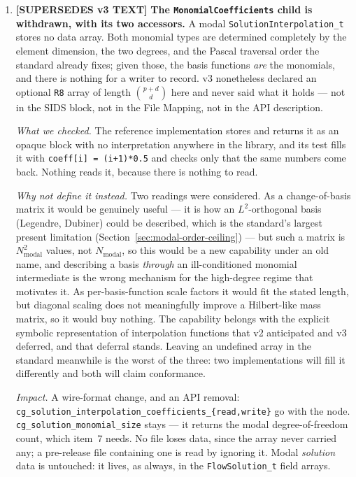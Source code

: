 \documentclass[11pt,letterpaper]{article}
\newif\ifvfourdraft
\newenvironment{v4block}{\ifvfourdraft\color{v4violet}\fi\ignorespaces}{\par}
\newcommand{\SUPERSEDESIV}{\ifvfourdraft
  \textcolor{v4violet}{\textbf{[SUPERSEDES v3 TEXT]}}\else
  \textcolor{clarifybrown}{\textbf{[SUPERSEDES v3 TEXT]}}\fi}
\begin{document}
{\begin{v4block}
\begin{enumerate}[leftmargin=1.4em,itemsep=0.5em]
  \item \SUPERSEDESIV{} \textbf{The \texttt{MonomialCoefficients} child is
    withdrawn, with its two accessors.}  A modal
    \texttt{SolutionInterpolation\_t} stores no data array.  Both monomial types
    are determined completely by the element dimension, the two degrees, and the
    Pascal traversal order the standard already fixes; given those, the basis
    functions \emph{are} the monomials, and there is nothing for a writer to
    record.  v3 nonetheless declared an optional \texttt{R8} array of length
    $\binom{p+d}{d}$ here and never said what it holds --- not in the SIDS block,
    not in the File Mapping, not in the API description.

    \textit{What we checked.}  The reference implementation stores and returns it
    as an opaque block with no interpretation anywhere in the library, and its
    test fills it with \texttt{coeff[i] = (i+1)*0.5} and checks only that the same
    numbers come back.  Nothing reads it, because there is nothing to read.

    \textit{Why not define it instead.}  Two readings were considered.  As a
    change-of-basis matrix it would be genuinely useful --- it is how an
    $L^2$-orthogonal basis (Legendre, Dubiner) could be described, which is the
    standard's largest present limitation (Section~\ref{sec:modal-order-ceiling})
    --- but such a matrix is $N_\mathrm{modal}^2$ values, not $N_\mathrm{modal}$,
    so this would be a new capability under an old name, and describing a basis
    \emph{through} an ill-conditioned monomial intermediate is the wrong
    mechanism for the high-degree regime that motivates it.  As per-basis-function
    scale factors it would fit the stated length, but diagonal scaling does not
    meaningfully improve a Hilbert-like mass matrix, so it would buy nothing.  The
    capability belongs with the explicit symbolic representation of interpolation
    functions that v2 anticipated and v3 deferred, and that deferral stands.
    Leaving an undefined array in the standard meanwhile is the worst of the
    three: two implementations will fill it differently and both will claim
    conformance.

    \textit{Impact.}  A wire-format change, and an API removal:
    \texttt{cg\_solution\_interpolation\_coefficients\_\{read,write\}} go with the
    node.  \texttt{cg\_solution\_monomial\_size} stays --- it returns the modal
    degree-of-freedom count, which item~7 needs.  No file loses data, since the
    array never carried any; a pre-release file containing one is read by ignoring
    it.  Modal \emph{solution} data is untouched: it lives, as always, in the
    \texttt{FlowSolution\_t} field arrays.


\end{enumerate}
\end{v4block}}
\end{document}
